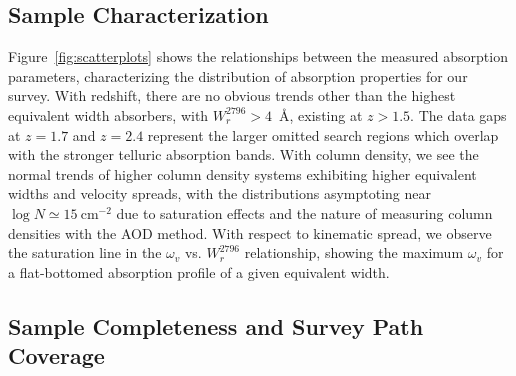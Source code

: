 \documentclass[iop,apj,numberedappendix,appendixfloats,twocolappendix]{emulateapj}
\begin{document}
\subsection{Sample Characterization}
\label{sec:sample}

\begin{figure*}[bth]
\caption{Correlations between measured absorption properties for the Vulture survey. $\log N$ is the ${\MgII}$ AOD column density, $\omega_v$ is the kinematic spread, $W_r^{2796}$ is the rest frame {} equivalent width, and $z$ is the absorption redshift.}
\label{fig:scatterplots}
\end{figure*}

Figure~\ref{fig:scatterplots} shows the relationships between the measured absorption parameters, characterizing the distribution of absorption properties for our survey. With redshift, there are no obvious trends other than the highest equivalent width absorbers, with $W_r^{2796} > 4$~{\AA}, existing at $z > 1.5$. The data gaps at $z = 1.7$ and $z = 2.4$ represent the larger omitted search regions which overlap with the stronger telluric absorption bands. With column density, we see the normal trends of higher column density systems exhibiting higher equivalent widths and velocity spreads, with the distributions asymptoting near $\log N \simeq 15~\mathrm{cm^{-2}}$ due to saturation effects and the nature of measuring column densities with the AOD method. With respect to kinematic spread, we observe the saturation line in the $\omega_v$ vs. $W_r^{2796}$ relationship, showing the maximum $\omega_v$ for a flat-bottomed absorption profile of a given equivalent width.

\subsection{Sample Completeness and Survey Path Coverage}

\begin{figure*}[bth]
\caption{The function $g(W_r^{\lambda2796}, z)$ shown as a heat map with the colors representing the value of $g(W_r^{2796}, z)$. This is the number of spectra in which an absorption line of a given equivalent width and a given redshift may be detected according to the detection limit of the spectrum. The vertical black bars representing no redshift path length coverage show the omitted wavelength regions of the survey based upon contaminating telluric absorption features.}
\label{fig:gwz}
\end{figure*}
\end{document}
